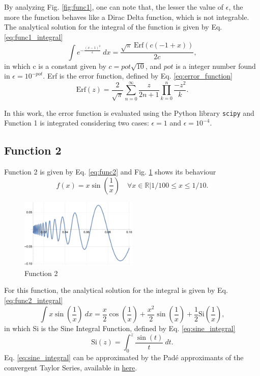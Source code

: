 By analyzing Fig. \ref{fig:func1}, one can note that, the lesser the value of $\epsilon$, the more the function behaves like a Dirac Delta function, which is not integrable. The analytical solution for the integral of the function is given by Eq. \eqref{eq:func1_integral}
\begin{equation}
    \label{eq:func1_integral}
    \int e^{-\frac{(x-1)^2}{\epsilon}} ~dx= \frac{\sqrt{\pi} ~\text{Erf}\left(c (- 1 + x)\right)}{2 c},
\end{equation}
in which c is a constant given by $c = pot\sqrt{10}$, and $pot$ is a integer number found in $\epsilon = 10^{-pot}$. Erf is the error function, defined by Eq. \eqref{eq:error_function}
\begin{equation}
    \label{eq:error_function}
    \text{Erf}(z) = \frac{2}{\sqrt{\pi}} \sum_{n=0}^{\infty} \frac{z}{2n + 1} \prod_{k=0}^{n} \frac{-z^2}{k}.
\end{equation}

In this work, the error function is evaluated using the Python library \texttt{scipy} and Function 1 is integrated considering two cases: $\epsilon = 1$ and $\epsilon = 10^{-4}$.
\subsection{Function 2}
Function 2 is given by Eq. \eqref{eq:func2} and Fig. \ref{fig:func2} shows its behaviour
\begin{equation}
    \label{eq:func2}
    f(x) = x\sin\left(\frac{1}{x}\right) \quad \forall x \in \mathbb{R} | 1/100 \leq x \leq 1/10.
\end{equation}
\begin{figure}[H]
    \centering
    \includegraphics[width=0.5\textwidth]{../Figures/func2.pdf}
    \caption{Function 2}
    \label{fig:func2}
\end{figure}

For this function, the analytical solution for the integral is given by Eq. \eqref{eq:func2_integral}
\begin{equation}
    \label{eq:func2_integral}
    \int x\sin\left(\frac{1}{x}\right) ~dx = \frac{x}{2}\cos\left(\frac{1}{x}\right) + \frac{x^2}{2}\sin\left(\frac{1}{x}\right) + \frac{1}{2}\text{Si}\left(\frac{1}{x}\right),
\end{equation}
in which Si is the Sine Integral Function, defined by Eq. \eqref{eq:sine_integral}
\begin{equation}
    \label{eq:sine_integral}
    \text{Si}(z) = \int_{0}^{z} \frac{\sin(t)}{t} ~dt.
\end{equation}
Eq. \eqref{eq:sine_integral} can be approximated by the Pad\'e approximants of the convergent Taylor Series, available in \href{https://en.wikipedia.org/wiki/Trigonometric_integral#Asymptotic_series_(for_large_argument)}{here}.

